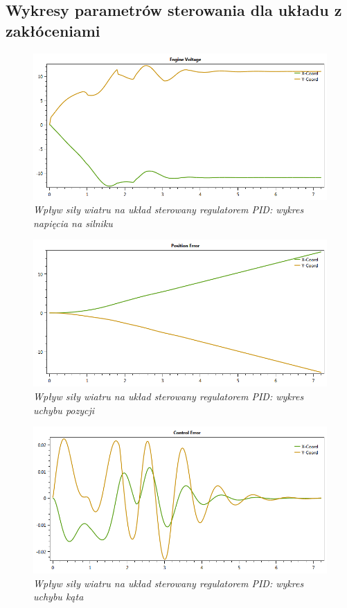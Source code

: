 \documentclass[12pt, oneside]{report}
\theoremstyle{definition}
\begin{document}
\begin{appendices}
  \chapter{Wykresy parametrów sterowania dla układu z zakłóceniami}
\label{appendix:B}
\begin{figure}[H]
	\centering
		\includegraphics[width = 400pt]{WindPIDEV} 
		\caption{\textit{Wpływ siły wiatru na układ sterowany regulatorem PID: wykres napięcia na silniku}}
		\label{plot:WindPIDEV}
\end{figure}

\begin{figure}[H]
	\centering
		\includegraphics[width = 400pt]{WindPIDCEP} 
		\caption{\textit{Wpływ siły wiatru na układ sterowany regulatorem PID: wykres uchybu pozycji}}
		\label{plot:WindPIDCEP}
\end{figure}

\begin{figure}[H]
	\centering
		\includegraphics[width = 400pt]{WindPIDCEA} 
		\caption{\textit{Wpływ siły wiatru na układ sterowany regulatorem PID: wykres uchybu kąta}}
		\label{plot:WindPIDCEA}
\end{figure}

  
\end{appendices}
\end{document}
